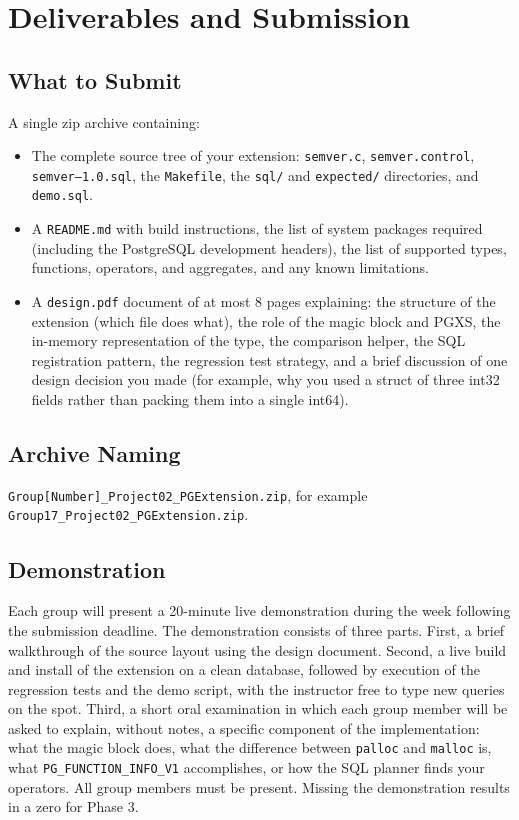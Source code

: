 \documentclass[11pt,a4paper]{article}
\begin{document}
\section{Deliverables and Submission}

\subsection{What to Submit}
A single zip archive containing:

\begin{itemize}
\item The complete source tree of your extension: \texttt{semver.c}, \texttt{semver.control}, \texttt{semver--1.0.sql}, the \texttt{Makefile}, the \texttt{sql/} and \texttt{expected/} directories, and \texttt{demo.sql}.
\item A \texttt{README.md} with build instructions, the list of system packages required (including the PostgreSQL development headers), the list of supported types, functions, operators, and aggregates, and any known limitations.
\item A \texttt{design.pdf} document of at most 8 pages explaining: the structure of the extension (which file does what), the role of the magic block and PGXS, the in-memory representation of the type, the comparison helper, the SQL registration pattern, the regression test strategy, and a brief discussion of one design decision you made (for example, why you used a struct of three int32 fields rather than packing them into a single int64).
\end{itemize}

\subsection{Archive Naming}
\texttt{Group[Number]\_Project02\_PGExtension.zip}, for example \texttt{Group17\_Project02\_PGExtension.zip}.

\subsection{Demonstration}
Each group will present a 20-minute live demonstration during the week following the submission deadline. The demonstration consists of three parts. First, a brief walkthrough of the source layout using the design document. Second, a live build and install of the extension on a clean database, followed by execution of the regression tests and the demo script, with the instructor free to type new queries on the spot. Third, a short oral examination in which each group member will be asked to explain, without notes, a specific component of the implementation: what the magic block does, what the difference between \texttt{palloc} and \texttt{malloc} is, what \texttt{PG\_FUNCTION\_INFO\_V1} accomplishes, or how the SQL planner finds your operators. All group members must be present. Missing the demonstration results in a zero for Phase 3.
\end{document}
